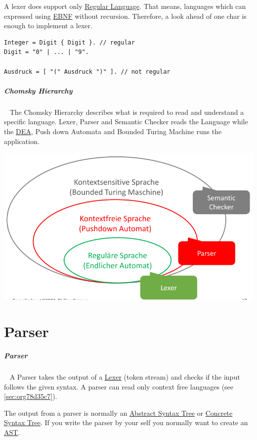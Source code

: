 \documentclass[11pt,twoside,landscape]{article}
\begin{document}
\begin{multicols}{3}
A lexer does support only \href{../../../roam/20221228124714-regular_language.org}{Regular Language}.
That means, languages which can expressed using \href{../../../roam/20221228120443-how_do_you_specify_the_syntax_of_a_language.org}{EBNF} without recursion.
Therefore, a look ahead of one char is enough to implement a lexer.

\begin{verbatim}
Integer = Digit { Digit }. // regular
Digit = "0" | ... | "9".

Ausdruck = [ "(" Ausdruck ")" ]. // not regular
\end{verbatim}
\subparagraph{Chomsky Hierarchy} \
\label{sec:org78d35c7}
The Chomsky Hierarchy describes what is required to read and understand a specific language.
Lexer, Parser and Semantic Checker reads the Language while the \href{../../../roam/20211109182310-deterministic_finite_automaton.org}{DEA}, Push down Automata and Bounded Turing Machine runs the application.

{
\begin{center}
\includegraphics[width=.9\linewidth]{img/chomsky_hierarchie.png}
\end{center}
\label{fig:chomsky-hierarchy}
}

\section{Parser}
\label{sec:org93f4f57}
\subparagraph{Parser} \
\label{sec:org0f01bf2}
A Parser takes the output of a \href{../../../roam/20221228115248-what_is_a_lexer.org}{Lexer} (token stream) and checks if the input follows the given syntax.
A parser can read only context free languages (see \ref{sec:org78d35c7}).

The output from a parser is normally an \href{../../../roam/20221228141024-what_is_a_abstract_syntax_tree.org}{Abstract Syntax Tree} or \href{../../../roam/20221228140533-what_is_a_parse_tree.org}{Concrete Syntax Tree}.
If you write the parser by your self you normally want to create an \href{../../../roam/20221228141024-what_is_a_abstract_syntax_tree.org}{AST}.


\end{multicols}
\end{document}

